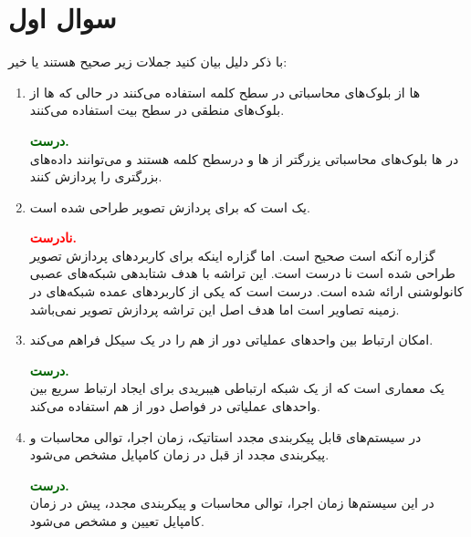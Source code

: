 \section{سوال اول}


با ذکر دلیل بیان کنید جملات زیر صحیح هستند یا خیر:


\begin{enumerate}
	\item {}ها از بلوک‌های محاسباتی در سطح کلمه استفاده می‌کنند در حالی که ها از بلوک‌های منطقی در سطح بیت استفاده می‌کنند.
	\begin{qsolve}
		\textbf{\textcolor{darkgreen}{درست.}}\\
		در  ها بلوک‌های محاسباتی یزرگتر از  ها و درسطح کلمه هستند و می‌توانند داده‌های بزرگتری را پردازش کنند.
		
	\end{qsolve}
	
	
	
	\item \lr{‫‪Eyeriss‬‬}
	 یک  است که برای پردازش تصویر طراحی شده است.
	\begin{qsolve}
		\textbf{\textcolor{red}{نادرست.}}\\
		گزاره آنکه  است صحیح است. اما گزاره اینکه برای کاربرد‌های پردازش تصویر طراحی شده است نا درست است. این تراشه با هدف شتابدهی شبکه‌های عصبی کانولوشنی ارائه شده است. درست است که یکی از کاربرد‌های عمده شبکه‌های  در زمینه تصاویر است اما هدف اصل این‌ تراشه پردازش تصویر نمی‌باشد.
		
		
	\end{qsolve}
	
	
	
	
	\item
	 امکان ارتباط بین واحدهای عملیاتی دور از هم را در یک سیکل فراهم می‌کند.
	\begin{qsolve}
		\textbf{\textcolor{darkgreen}{درست.}}\\
		یک معماری  است که از یک شبکه ارتباطی هیبریدی برای ایجاد ارتباط سریع بین واحدهای عملیاتی در فواصل دور از هم استفاده می‌کند.
	\end{qsolve}
	
	
	
	\item در سیستم‌های قابل پیکربندی مجدد استاتیک، زمان اجرا، توالی محاسبات و پیکربندی مجدد از قبل در زمان کامپایل مشخص می‌شود.
	\begin{qsolve}
		\textbf{\textcolor{darkgreen}{درست.}}\\
		در این سیستم‌‌ها زمان اجرا، توالی محاسبات و پیکربندی مجدد، پیش در زمان کامپایل تعیین و مشخص می‌شود.
		 

\end{qsolve}
\end{enumerate}
